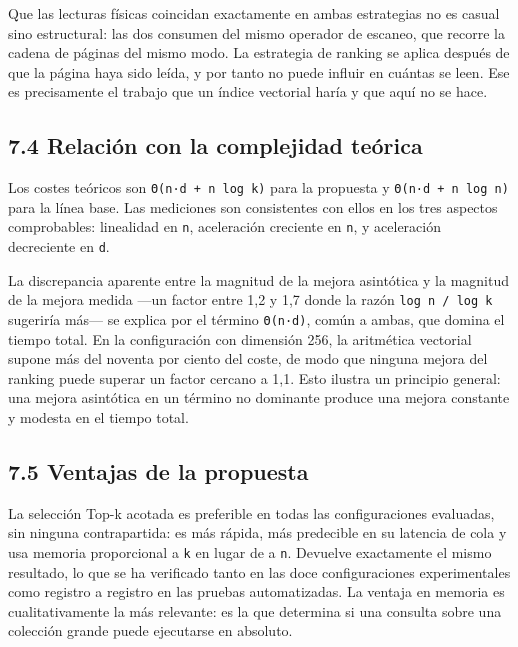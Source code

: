 \documentclass[11pt,a4paper]{article}
\let\pandocsubsection\subsection
\let\subsection\section
\let\subsubsection\pandocsubsection
\begin{document}
Que las lecturas físicas coincidan exactamente en ambas estrategias no
es casual sino estructural: las dos consumen del mismo operador de
escaneo, que recorre la cadena de páginas del mismo modo. La estrategia
de ranking se aplica después de que la página haya sido leída, y por
tanto no puede influir en cuántas se leen. Ese es precisamente el
trabajo que un índice vectorial haría y que aquí no se hace.

\subsubsection{7.4 Relación con la complejidad
teórica}\label{74-relaciuxf3n-con-la-complejidad-teuxf3rica}

Los costes teóricos son \texttt{Θ(n·d\ +\ n\ log\ k)} para la propuesta
y \texttt{Θ(n·d\ +\ n\ log\ n)} para la línea base. Las mediciones son
consistentes con ellos en los tres aspectos comprobables: linealidad en
\texttt{n}, aceleración creciente en \texttt{n}, y aceleración
decreciente en \texttt{d}.

La discrepancia aparente entre la magnitud de la mejora asintótica y la
magnitud de la mejora medida ---un factor entre 1,2 y 1,7 donde la razón
\texttt{log\ n\ /\ log\ k} sugeriría más--- se explica por el término
\texttt{Θ(n·d)}, común a ambas, que domina el tiempo total. En la
configuración con dimensión 256, la aritmética vectorial supone más del
noventa por ciento del coste, de modo que ninguna mejora del ranking
puede superar un factor cercano a 1,1. Esto ilustra un principio
general: una mejora asintótica en un término no dominante produce una
mejora constante y modesta en el tiempo total.

\subsubsection{7.5 Ventajas de la
propuesta}\label{75-ventajas-de-la-propuesta}

La selección Top-k acotada es preferible en todas las configuraciones
evaluadas, sin ninguna contrapartida: es más rápida, más predecible en
su latencia de cola y usa memoria proporcional a \texttt{k} en lugar de
a \texttt{n}. Devuelve exactamente el mismo resultado, lo que se ha
verificado tanto en las doce configuraciones experimentales como
registro a registro en las pruebas automatizadas. La ventaja en memoria
es cualitativamente la más relevante: es la que determina si una
consulta sobre una colección grande puede ejecutarse en absoluto.
\end{document}
